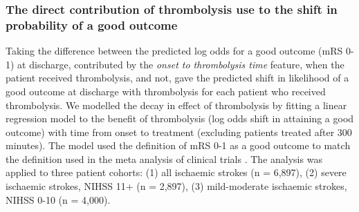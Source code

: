 \subsubsection{The direct contribution of thrombolysis use to the shift in probability of a good outcome}

Taking the difference between the predicted log odds for a good outcome (mRS 0-1) at discharge, contributed by the \textit{onset to thrombolysis time} feature, when the patient received thrombolysis, and not, gave the predicted shift in likelihood of a good outcome at discharge with thrombolysis for each patient who received thrombolysis. We modelled the decay in effect of thrombolysis by fitting a linear regression model to the benefit of thrombolysis (log odds shift in attaining a good outcome) with time from onset to treatment (excluding patients treated after 300 minutes). The model used the definition of mRS 0-1 as a good outcome to match the definition used in the meta analysis of clinical trials \cite{emberson_effect_2014}. The analysis was applied to three patient cohorts: (1) all ischaemic strokes (n = 6,897), (2) severe ischaemic strokes, NIHSS 11+ (n = 2,897), (3) mild-moderate ischaemic strokes, NIHSS 0-10 (n = 4,000).
